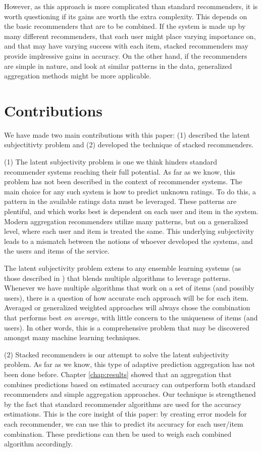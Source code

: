 However, as this approach is more complicated than standard recommenders,
it is worth questioning if its gains are worth the extra complexity.
This depends on the basic recommenders that are to be combined.
If the system is made up by many different recommenders,
that each user might place varying importance on,
and that may have varying success with each item,
stacked recommenders may provide implressive gains in accuracy.
On the other hand, if the recommenders are simple in nature,
and look at similar patterns in the data,
generalized aggregation methods might be more applicable.




\section{Contributions} 

We have made two main contributions with this paper:
(1) described the latent subjectitivty problem and
(2) developed the technique of stacked recommenders.

(1) The latent subjectivity problem is one we think hinders
standard recommender systems reaching their full potential.
As far as we know, this problem has not been described
in the context of recommender systems.
The main choice for any such system is how to predict unknown ratings.
To do this, a pattern in the available ratings data must be leveraged.
These patterns are plentiful, and which works best is dependent on
each user and item in the system.
Modern aggregation recommenders utilize many patterns, but on a generalized
level, where each user and item is treated the same.
This underlying subjectivity leads to a mismatch between the notions
of whoever developed the systems, and the users and items of the service.

The latent subjectivity problem extens to any ensemble learning systems
(as those described in \cite{Polikar2006}) that blends multiple 
algorithms to leverage patterns.
Whenever we have multiple algorithms that work on a set of items
(and possibly users), there is a question of how accurate each
approach will be for each item.
Averaged or generalized weighted approaches will always
chose the combination that performs best \emph{on average},
with little concern to the uniqueness of items (and users).
In other words, this is a comprehensive problem
that may be discovered amongst many machine learning techniques.

(2) Stacked recommenders is our attempt to solve the latent subjectivity problem.
As far as we know, this type of adaptive prediction aggregation has not been done before.
Chapter \ref{chap:results} showed that an aggregation that combines predictions based
on estimated accuracy can outperform both standard recommenders and simple aggregation approaches.
Our technique is strengthened by the fact that standard recommender algorithms
are used for the accuracy estimations.
This is the core insight of this paper: 
by creating error models for each recommender, we can use this to predict
its accuracy for each user/item combination.
These predictions can then be used to weigh each combined algorithm accordingly.

